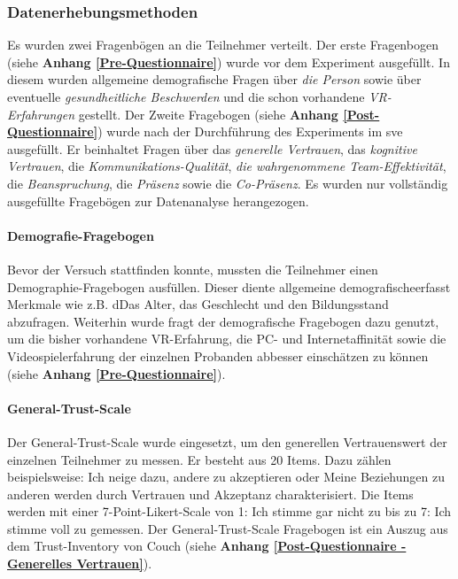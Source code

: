 \documentclass[a4paper,11pt]{article}%
\renewcommand{\\}{\vspace*{0.5\baselineskip} \newline}
\begin{document}
			\subsubsection{Datenerhebungsmethoden}
Es wurden zwei Fragenbögen an die Teilnehmer verteilt. Der erste Fragenbogen (siehe \textbf{Anhang \ref{Pre-Questionnaire}}) wurde vor dem Experiment ausgefüllt. In diesem wurden allgemeine demografische Fragen über \textit{die Person} sowie über eventuelle \textit{gesundheitliche Beschwerden} und die schon vorhandene \textit{VR-Erfahrungen} gestellt. Der Zweite Fragebogen (siehe \textbf{Anhang \ref{Post-Questionnaire}}) wurde nach der Durchführung des Experiments im \ac{sve} ausgefüllt. Er beinhaltet Fragen über das \textit{generelle Vertrauen}, das \textit{kognitive Vertrauen}, die \textit{Kommunikations-Qualität}, \textit{die wahrgenommene Team-Effektivität}, die \textit{Beanspruchung}, die \textit{Präsenz} sowie die \textit{Co-Präsenz}. 
Es wurden nur vollständig ausgefüllte Fragebögen zur Datenanalyse herangezogen. \\
				
		\paragraph{Demografie-Fragebogen}
Bevor der Versuch stattfinden konnte, mussten die Teilnehmer einen Demographie-Fragebogen ausfüllen. Dieser diente allgemeine demografischeerfasst Merkmale wie z.B. dDas Alter, das Geschlecht und den Bildungsstand abzufragen. Weiterhin wurde fragt der demografische Fragebogen dazu genutzt, um die bisher vorhandene VR-Erfahrung, die PC- und Internetaffinität sowie die Videospielerfahrung der einzelnen Probanden abbesser einschätzen zu können (siehe \textbf{Anhang \ref{Pre-Questionnaire}}).

		\paragraph{General-Trust-Scale}
Der General-Trust-Scale \citep{couch1996assessment} wurde eingesetzt, um den generellen Vertrauenswert der einzelnen Teilnehmer zu messen. Er besteht aus 20 Items. Dazu zählen beispielsweise: \glqq{}Ich neige dazu, andere zu akzeptieren\dq{} oder \glqq{}Meine Beziehungen zu anderen werden durch Vertrauen und Akzeptanz charakterisiert\dq{}. Die Items werden mit einer 7-Point-Likert-Scale von 1: \glqq{}Ich stimme gar nicht zu\dq{} bis zu 7: \glqq{}Ich stimme voll zu\dq{} gemessen. Der General-Trust-Scale Fragebogen ist ein Auszug aus dem \glqq{}Trust-Inventory von Couch\dq{} (siehe \textbf{Anhang \ref{Post-Questionnaire - Generelles Vertrauen}}).
\end{document}
